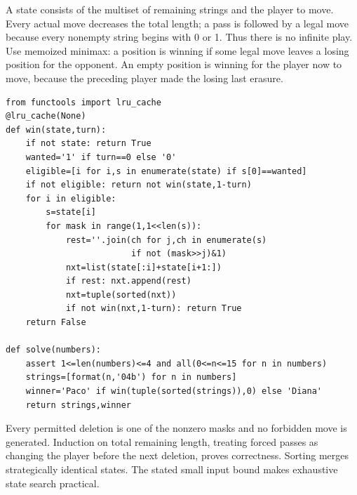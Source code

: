 A state consists of the multiset of remaining strings and the player to move. Every actual move decreases the total length; a pass is followed by a legal move because every nonempty string begins with 0 or 1. Thus there is no infinite play. Use memoized minimax: a position is winning if some legal move leaves a losing position for the opponent. An empty position is winning for the player now to move, because the preceding player made the losing last erasure.\begin{verbatim}
from functools import lru_cache
@lru_cache(None)
def win(state,turn):
    if not state: return True
    wanted='1' if turn==0 else '0'
    eligible=[i for i,s in enumerate(state) if s[0]==wanted]
    if not eligible: return not win(state,1-turn)
    for i in eligible:
        s=state[i]
        for mask in range(1,1<<len(s)):
            rest=''.join(ch for j,ch in enumerate(s)
                         if not (mask>>j)&1)
            nxt=list(state[:i]+state[i+1:])
            if rest: nxt.append(rest)
            nxt=tuple(sorted(nxt))
            if not win(nxt,1-turn): return True
    return False

def solve(numbers):
    assert 1<=len(numbers)<=4 and all(0<=n<=15 for n in numbers)
    strings=[format(n,'04b') for n in numbers]
    winner='Paco' if win(tuple(sorted(strings)),0) else 'Diana'
    return strings,winner
\end{verbatim}
Every permitted deletion is one of the nonzero masks and no forbidden move is generated. Induction on total remaining length, treating forced passes as changing the player before the next deletion, proves correctness. Sorting merges strategically identical states. The stated small input bound makes exhaustive state search practical.
